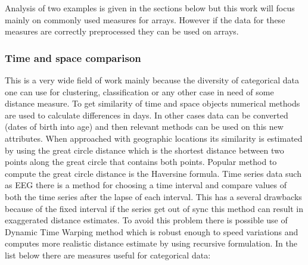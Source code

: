 Analysis of two examples is given in the sections below but this work will focus mainly on commonly used measures for arrays. However if the data for these measures are correctly preprocessed they can be used on arrays.

\subsubsection{Time and space comparison}
This is a very wide field of work mainly because the diversity of categorical data one can use for clustering, classification or any other case in need of some distance measure.
To get similarity of time and space objects numerical methods are used to calculate differences in days. In other cases data can be converted (dates of birth into age) and then relevant methods can be used on this new attributes.
When approached with geographic locations its similarity is estimated by using the great circle distance which is the shortest distance between two points along the great circle that contains both points. Popular method to compute the great circle distance is the Haversine formula.
Time series data such as EEG there is a method for choosing a time interval and compare values of both the time series after the lapse of each interval. This has a several drawbacks because of the fixed interval if the series get out of sync this method can result in exaggerated distance estimates. To avoid this problem there is possible use of Dynamic Time Warping method which is robust enough to speed variations and computes more realistic distance estimate by using recursive formulation.
In the list below there are measures useful for categorical data:
